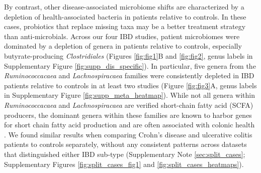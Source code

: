 By contrast, other disease-associated microbiome shifts are characterized by a depletion of health-associated bacteria in patients relative to controls.
In these cases, probiotics that replace missing taxa may be a better treatment strategy than anti-microbials.
Across our four IBD studies, patient microbiomes were dominated by a depletion of genera in patients relative to controls, especially butyrate-producing \textit{Clostridiales} \cite{ibd-papa,ibd-gevers,ibd-hut,ibd-engstrand} (Figures \ref{fig:fig1}B and \ref{fig:fig2}, genus labels in Supplementary Figure \ref{fig:supp_dis_specific}).
In particular, five genera from the \textit{Ruminococcacaea} and \textit{Lachnospiracaea} families were consistently depleted in IBD patients relative to controls in at least two studies (Figure \ref{fig:fig3}A, genus labels in Supplementary Figure \ref{fig:supp_meta_heatmap}).
While not all genera within \textit{Ruminococcacaea} and \textit{Lachnospiracaea} are verified short-chain fatty acid (SCFA) producers, the dominant genera within these families are known to harbor genes for short chain fatty acid production \cite{louis2010diversity} and are often associated with colonic health \cite{flint2012role,miquel2013faecalibacterium,reeves2012suppression}.
We found similar results when comparing Crohn's disease and ulcerative colitis patients to controls separately, without any consistent patterns across datasets that distinguished either IBD sub-type (Supplementary Note \ref{sec:split_cases}; Supplementary Figures \ref{fig:split_cases_fig1} and \ref{fig:split_cases_heatmaps}).

